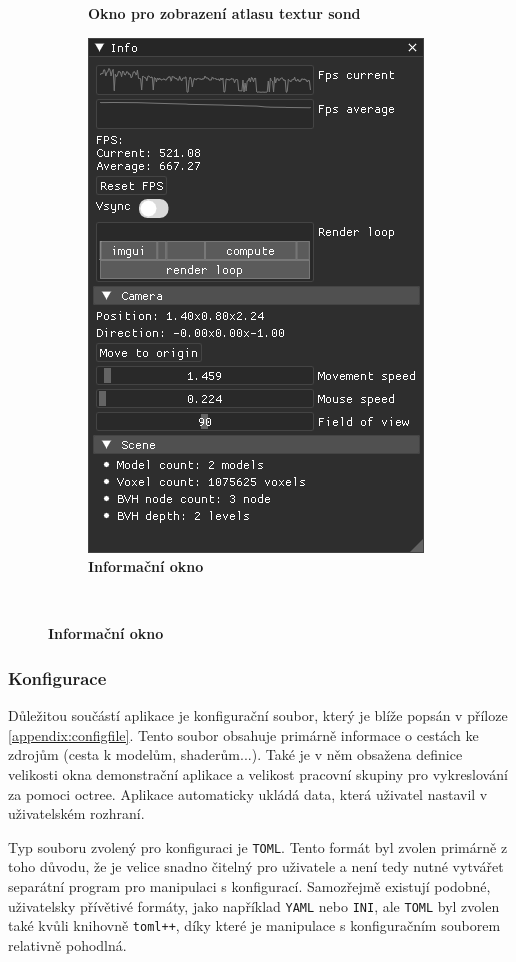 \begin{figure}[H]
\begin{subfigure}[t]{.49\textwidth}
		\caption{\textbf{Okno pro zobrazení atlasu textur sond}}
		\label{fig:probe_ui}
	\end{subfigure}
		\begin{subfigure}[t]{1\textwidth}
			\centering
        	\includegraphics[scale=1]{images/dp_ui_info.png}
        	\caption{\textbf{Informační okno}}
        	\label{fig:info_ui}
	\end{subfigure}\\
	\captionsetup{justification=centering}
	\label{fig:UI}
\end{figure}


\subsubsection{Konfigurace}
Důležitou součástí aplikace je konfigurační soubor, který je blíže popsán v příloze \ref{appendix:configfile}. Tento soubor obsahuje primárně informace o cestách ke zdrojům (cesta k modelům, shaderům...). Také je v něm obsažena definice velikosti okna demonstrační aplikace a velikost pracovní skupiny pro vykreslování za pomoci octree. Aplikace automaticky ukládá data, která uživatel nastavil v uživatelském rozhraní.

Typ souboru zvolený pro konfiguraci je \texttt{TOML}. Tento formát byl zvolen primárně z toho důvodu, že je velice snadno čitelný pro uživatele a není tedy nutné vytvářet separátní program pro manipulaci s konfigurací. Samozřejmě existují podobné, uživatelsky přívětivé formáty, jako například \texttt{YAML} nebo \texttt{INI}, ale \texttt{TOML} byl zvolen také kvůli knihovně \texttt{toml++}, díky které je manipulace s konfiguračním souborem relativně pohodlná. 


